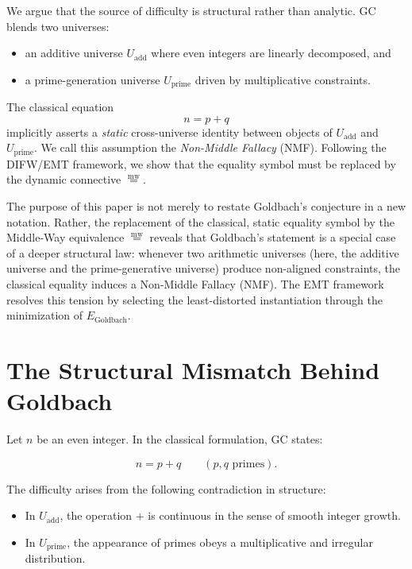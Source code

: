 \documentclass[12pt]{article}
\newcommand{\mweq}{\mathrel{\overset{\mathrm{mw}}{=}}}
\theoremstyle{definition}
\theoremstyle{remark}
\begin{document}
We argue that the source of difficulty is structural rather than
analytic. GC blends two universes:

\begin{itemize}
    \item an additive universe $U_{\mathrm{add}}$ where even integers
    are linearly decomposed, and
    \item a prime-generation universe $U_{\mathrm{prime}}$ driven by
    multiplicative constraints.
\end{itemize}

The classical equation
\[
n = p + q
\]
implicitly asserts a \emph{static} cross-universe identity between
objects of $U_{\mathrm{add}}$ and $U_{\mathrm{prime}}$. We call this
assumption the \emph{Non-Middle Fallacy} (NMF). Following the DIFW/EMT
framework, we show that the equality symbol must be replaced by the
dynamic connective $\mweq$.

The purpose of this paper is not merely to restate Goldbach’s
conjecture in a new notation. Rather, the replacement of the classical,
static equality symbol by the Middle-Way equivalence $\mweq$ reveals
that Goldbach’s statement is a special case of a deeper structural law:
whenever two arithmetic universes (here, the additive universe and the
prime-generative universe) produce non-aligned constraints, the
classical equality induces a Non-Middle Fallacy (NMF). The EMT
framework resolves this tension by selecting the least-distorted
instantiation through the minimization of $E_{\text{Goldbach}}$.

\section{The Structural Mismatch Behind Goldbach}

Let $n$ be an even integer. In the classical formulation, GC states:

\begin{equation}
\label{eq:gc_classic}
n = p + q \qquad (p, q \text{ primes}).
\end{equation}

The difficulty arises from the following contradiction in structure:

\begin{itemize}
    \item In $U_{\mathrm{add}}$, the operation $+$ is continuous in
    the sense of smooth integer growth.
    \item In $U_{\mathrm{prime}}$, the appearance of primes obeys a
    multiplicative and irregular distribution.
\end{itemize}
\end{document}
